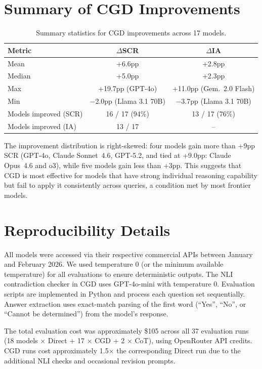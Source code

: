 \documentclass{article}
\newcommand{\method}{\textsc{CGD}}
\begin{document}
\section{Summary of CGD Improvements}
\label{app:cgdsummary}

\begin{table}[ht]
\caption{Summary statistics for \method{} improvements across 17 models.}
\label{tab:cgdsummary}
\begin{center}
\small
\begin{tabular}{lcc}
\toprule
\textbf{Metric} & \textbf{$\Delta$SCR} & \textbf{$\Delta$IA} \\
\midrule
Mean & +6.6pp & +2.8pp \\
Median & +5.0pp & +2.3pp \\
Max & +19.7pp (GPT-4o) & +11.0pp (Gem.\ 2.0 Flash) \\
Min & $-$2.0pp (Llama 3.1 70B) & $-$3.7pp (Llama 3.1 70B) \\
Models improved (SCR) & 16 / 17 (94\%) & 13 / 17 (76\%) \\
Models improved (IA) & 13 / 17 & -- \\
\bottomrule
\end{tabular}
\end{center}
\end{table}

The improvement distribution is right-skewed: four models gain more than +9pp SCR (GPT-4o, Claude Sonnet~4.6, GPT-5.2, and tied at +9.0pp: Claude Opus~4.6 and o3), while five models gain less than +3pp. This suggests that \method{} is most effective for models that have strong individual reasoning capability but fail to apply it consistently across queries, a condition met by most frontier models.

\section{Reproducibility Details}
\label{app:reproducibility}

All models were accessed via their respective commercial APIs between January and February 2026. We used temperature 0 (or the minimum available temperature) for all evaluations to ensure deterministic outputs. The NLI contradiction checker in \method{} uses GPT-4o-mini with temperature 0. Evaluation scripts are implemented in Python and process each question set sequentially. Answer extraction uses exact-match parsing of the first word (``Yes'', ``No'', or ``Cannot be determined'') from the model's response.

The total evaluation cost was approximately \$105 across all 37 evaluation runs (18 models $\times$ Direct + 17 $\times$ \method{} + 2 $\times$ CoT), using OpenRouter API credits. \method{} runs cost approximately 1.5$\times$ the corresponding Direct run due to the additional NLI checks and occasional revision prompts.
\end{document}
